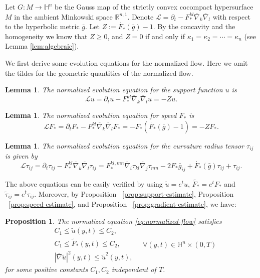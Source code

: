 \documentclass[reqno]{amsart}
\newtheorem{lemma}[theorem]{Lemma}
\newtheorem{proposition}[theorem]{Proposition}
\theoremstyle{remark}
\newcommand{\abs}[1]{\left\lvert{#1}\right\rvert}
\newcommand{\R}{\ensuremath{\mathbb{R}}}
\renewcommand{\H}{{\mathbb{H}}}
\newcommand{\bnabla}{\overline{\nabla}}
\newcommand{\bg}{\bar{g}}
\theoremstyle{definition}
\numberwithin{equation}{section}
\begin{document}
Let \(G:M\to \H^n\) be the Gauss map of the strictly convex cocompact hypersurface \(M\) in the ambient Minkowski space \(\R^{n,1}\). Denote \(\mathscr{L} = \partial_t - F_*^{kl}\bnabla_k \bnabla_l\) with respect to the hyperbolic metric \(\bg\). 
Let \(Z := \dot{F_*}(\bg)-1 \). By the concavity and the homogeneity we know that \(Z \geq 0\), and \(Z=0\) if and only if \(\kappa_1=\kappa_2 =\cdots=\kappa_n\) (see Lemma \ref{lem:algebraic}).

We first derive some evolution equations for the normalized flow. Here we omit the tildes for the geometric quantities of the normalized flow. 
\begin{lemma}\label{lem:normalized-equation-for-u}
The normalized evolution equation for the support function \(u\) is
\[ \mathscr{L}u = \partial_t u - F_*^{kl}\bnabla_k\bnabla_l u = - Zu.\]
\end{lemma}

\begin{lemma}
    The normalized evolution equation for speed $F_*$ is 
    \[\mathscr{L}F_* =  \partial_t F_* - F_*^{kl}\bnabla_k\bnabla_l F_* = - F_* \left(\dot{F_*}(\bg) - 1\right) = - ZF_*.  \]
\end{lemma}
\begin{lemma}
    The normalized evolution equation for the curvature radius tensor \(\tau_{ij}\) is given by 
    \[ \mathscr{L}\tau_{ij} = \partial_t \tau_{ij} - F_*^{kl}\bnabla_k\bnabla_l \tau_{ij} = F_*^{kl,mn}\bnabla_i\tau_{kl}\bnabla_j \tau_{mn} - 2F_* \bg_{ij} + \dot{F_*}(\bg)\tau_{ij} + \tau_{ij}.  \] 
\end{lemma}
The above equations can be easily verified by using \(\tilde{u} = e^t u\), \(\tilde{F_*} = e^t F_*\) and \(\tilde{\tau}_{ij} = e^t \tau_{ij}\). Moreover, by Proposition ~\ref{prop:support-estimate}, Proposition ~\ref{prop:speed-estimate}, and Proposition ~\ref{prop:gradient-estimate}, we have:
\begin{proposition}\label{prop:normalized-estimates}
    The normalized equation \eqref{eq:normalized-flow} satisfies 
    \begin{equation}
        \begin{aligned}
            &C_1 \leq \tilde{u}(y,t) \leq C_2, \\
            &C_1\leq \tilde{F}_*(y,t) \leq C_2, \\
            &\abs{\bnabla \tilde{u}}^2(y,t) \leq \tilde{u}^2(y,t),
        \end{aligned}\quad \forall (y,t)\in \H^n\times (0,T)
    \end{equation}
    for some positive constants \(C_1,C_2\) independent of \(T\).
\end{proposition}
\end{document}
